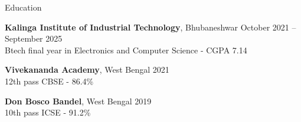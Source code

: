 \documentclass{resume} %
\begin{document}
%






\begin{rSection}{Education}

{\bf Kalinga Institute of Industrial Technology}, Bhubaneshwar  \hfill {October 2021 – September 2025}\\
Btech final year in Electronics and Computer Science - CGPA 7.14

{\bf Vivekananda Academy}, West Bengal   \hfill {2021} \\ 12th pass CBSE - 86.4\%

{\bf Don Bosco Bandel}, West Bengal  \hfill {2019}\\10th pass ICSE  - 91.2\%


\end{rSection}

\end{document}

